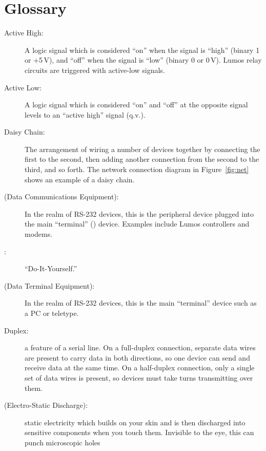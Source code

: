 \documentclass[letterpaper,twoside,onecolumn,openright,final]{memoir}
\begin{document}
\chapter{Glossary}\label{ch:glossary}
\begin{description}
	\item[Active High:]
		A logic signal which is considered ``on'' when the signal is ``high'' (binary 1 or +5\,V),
		and ``off'' when the signal is ``low'' (binary 0 or 0\,V).  Lumos relay circuits are 
		triggered with active-low signals.
	\item[Active Low:]
		A logic signal which is considered ``on'' and ``off'' at the opposite signal levels
		to an ``active high'' signal (q.v.).
	\item[Daisy Chain:]
		The arrangement of wiring a number of devices together by connecting the first to the second,
		then adding another connection from the second to the third, and so forth.  The network
		connection diagram in Figure~\ref{fig:net} shows an example of a daisy chain.
	\item[ (Data Communications Equipment):]  In the realm of RS-232 devices, this is the peripheral
		device plugged into the main ``terminal'' () device.  Examples include
		Lumos controllers and modems.
	\item[:] ``Do-It-Yourself.''
	\item[ (Data Terminal Equipment):]  In the realm of RS-232 devices, this is the
		main ``terminal'' device such as a PC or teletype.
	\item[Duplex:]
		a feature of a serial line.  On a full-duplex connection, separate data wires are present
		to carry data in both directions, so one device can send and receive data at the same time.
		On a half-duplex connection, only a single set of data wires is present, so devices must
		take turns transmitting over them.
	\item[ (Electro-Static Discharge):]
		static electricity which builds on your skin and is then discharged into sensitive
		components when you touch them.  Invisible to the eye, this can punch microscopic holes

\end{description}
\end{document}
